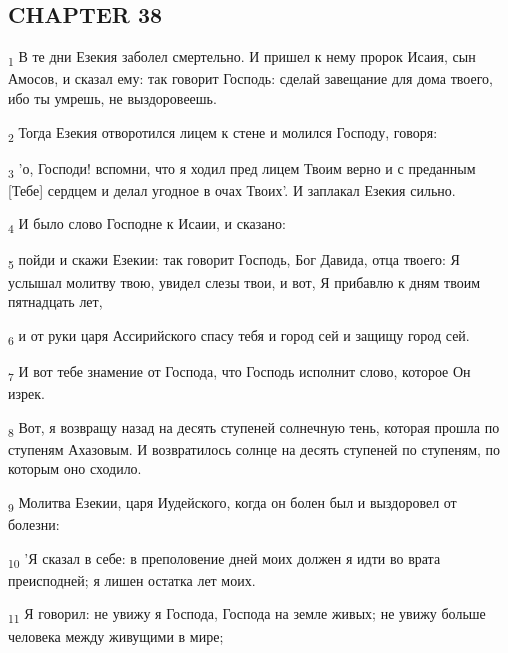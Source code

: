 \subsection{CHAPTER 38}
\begin{tcolorbox}
\textsubscript{1} В те дни Езекия заболел смертельно. И пришел к нему пророк Исаия, сын Амосов, и сказал ему: так говорит Господь: сделай завещание для дома твоего, ибо ты умрешь, не выздоровеешь.
\end{tcolorbox}
\begin{tcolorbox}
\textsubscript{2} Тогда Езекия отворотился лицем к стене и молился Господу, говоря:
\end{tcolorbox}
\begin{tcolorbox}
\textsubscript{3} 'о, Господи! вспомни, что я ходил пред лицем Твоим верно и с преданным [Тебе] сердцем и делал угодное в очах Твоих'. И заплакал Езекия сильно.
\end{tcolorbox}
\begin{tcolorbox}
\textsubscript{4} И было слово Господне к Исаии, и сказано:
\end{tcolorbox}
\begin{tcolorbox}
\textsubscript{5} пойди и скажи Езекии: так говорит Господь, Бог Давида, отца твоего: Я услышал молитву твою, увидел слезы твои, и вот, Я прибавлю к дням твоим пятнадцать лет,
\end{tcolorbox}
\begin{tcolorbox}
\textsubscript{6} и от руки царя Ассирийского спасу тебя и город сей и защищу город сей.
\end{tcolorbox}
\begin{tcolorbox}
\textsubscript{7} И вот тебе знамение от Господа, что Господь исполнит слово, которое Он изрек.
\end{tcolorbox}
\begin{tcolorbox}
\textsubscript{8} Вот, я возвращу назад на десять ступеней солнечную тень, которая прошла по ступеням Ахазовым. И возвратилось солнце на десять ступеней по ступеням, по которым оно сходило.
\end{tcolorbox}
\begin{tcolorbox}
\textsubscript{9} Молитва Езекии, царя Иудейского, когда он болен был и выздоровел от болезни:
\end{tcolorbox}
\begin{tcolorbox}
\textsubscript{10} 'Я сказал в себе: в преполовение дней моих должен я идти во врата преисподней; я лишен остатка лет моих.
\end{tcolorbox}
\begin{tcolorbox}
\textsubscript{11} Я говорил: не увижу я Господа, Господа на земле живых; не увижу больше человека между живущими в мире;
\end{tcolorbox}
